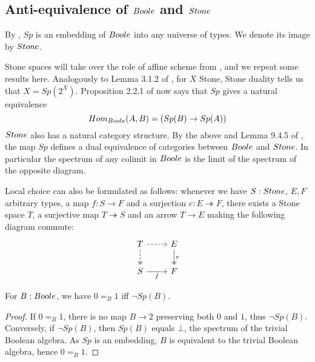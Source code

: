 \subsection{Anti-equivalence of $\Boole$ and $\Stone$}
By , $Sp$ is an embedding of $\Boole$ into any universe of types. 
We denote its image by $\Stone$. 

\begin{remark}\label{SpIsAntiEquivalence}
Stone spaces will take over the role of affine scheme from \cite{draft}, 
and we repeat some results here. 
Analogously to Lemma 3.1.2 of \cite{draft}, 
for $X$ Stone, Stone duality tells us that $X = Sp(2^X)$. 
%
Proposition 2.2.1 of \cite{draft} now says that 
$Sp$ gives a natural equivalence 
\begin{equation}
   Hom_{\Boole} (A, B) = (Sp(B) \to Sp(A))
\end{equation}
%
$\Stone$ also has a natural category structure.
By the above and Lemma 9.4.5 of \cite{hott}, 
the map $Sp$ defines a dual equivalence of categories between $\Boole$ and $\Stone$.
In particular the spectrum of any colimit in $\Boole$ is the limit of 
the spectrum of the opposite diagram. 
\end{remark}
\begin{remark}
  Local choice can also be formulated as follows:
  whenever we have $S:\Stone$, $E,F$ arbitrary types, a map $f:S \to F$ and a 
  surjection $e:E \twoheadrightarrow F$, 
  there exists a Stone space $T$, a surjective map 
  $T\twoheadrightarrow S$ and an arrow $T\to E$ making the following diagram commute:
    \begin{equation}\begin{tikzcd}
      T \arrow[d,dashed, two heads ] \arrow[r,dashed]&  E \arrow[d,""',two heads, "e"]\\
      S  \arrow[r, swap,"f"] & F
    \end{tikzcd}\end{equation}  
\end{remark}

\begin{lemma}\label{SpectrumEmptyIff01Equal}
  For $B:\Boole$, we have $0=_B1$ iff $\neg Sp(B)$.
\end{lemma}
\begin{proof}
  If $0=_B1$, there is no map $B\to 2$ preserving both $0$ and $1$, thus $\neg Sp(B)$. 
  Conversely, if $\neg Sp(B)$, then 
  $Sp(B)$ equals $\bot$, the spectrum of the trivial Boolean algebra. 
  As $Sp$ is an embedding, $B$ is equivalent to the trivial Boolean algebra, hence $0=_B1$. 
\end{proof}

